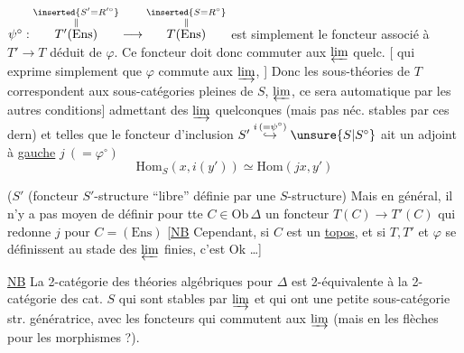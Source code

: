  $\psi^\circ:\overset{\substack{\inserted{S'=R'^\circ}\\\Vert}}{T'(\mathrm{Ens})}\longrightarrow\overset{\substack{\inserted{S=R^\circ}\\\Vert}}{T(\mathrm{Ens})}$ est simplement le foncteur associé à $T'\longrightarrow T$ déduit de $\varphi$. Ce foncteur doit donc commuter aux $\varprojlim$ quelc. [ qui exprime simplement que $\varphi$ commute aux $\varinjlim$, ] Donc les sous-théories de $T$ correspondent aux sous-catégories pleines  de $S$,  \inserted{[stables par} $\varprojlim$, ce sera automatique par les autres conditions] admettant des $\varinjlim$ quelconques (mais pas néc. stables par ces dern) et telles que le foncteur d'inclusion $S'\overset{i\,(=\psi^\circ)}{\hookrightarrow}\unsure{S|S^\circ}$ ait un adjoint à \uline{gauche} \deleted{$\unsure{\varphi}$} $j\ (= \varphi^\circ)$
\[
\mathrm{Hom}_{S}(x,i(y'))\simeq\mathrm{Hom}(jx,y')
\]

 \deleted{[Mais en général on (Structure} ($S'$ (foncteur $S'$-structure ``libre'' définie par une $S$-structure) Mais en général, il n'y a pas moyen de définir pour tte $C\in\mathrm{Ob}\,\Delta$ un foncteur $T(C)\longrightarrow T'(C)$ qui  redonne $j$  pour $C=(\mathrm{Ens})$ [\uline{NB} Cependant, si $C$ est un \uline{topos}, et si $T,T'$ et $\varphi$ se définissent au stade des $\varprojlim$ finies, c'est Ok \ldots]

\uline{NB} La 2-catégorie des théories algébriques pour $\Delta$ est 2-équivalente à la 2-catégorie des cat. $S$ qui sont stables par  $\varinjlim$  et qui ont une petite sous-catégorie str. génératrice, avec les foncteurs qui commutent aux $\varinjlim$ (mais en  les flèches pour les morphismes ?). 
